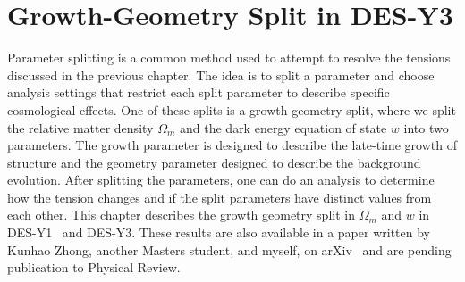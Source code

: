 \chapter{Growth-Geometry Split in DES-Y3}
Parameter splitting is a common method used to attempt to resolve the tensions discussed in the previous chapter. The idea is to split a parameter and choose analysis settings that restrict each split parameter to describe specific cosmological effects. One of these splits is a growth-geometry split, where we split the relative matter density $\Omega_m$ and the dark energy equation of state $w$ into two parameters. The growth parameter is designed to describe the late-time growth of structure and the geometry parameter designed to describe the background evolution. After splitting the parameters, one can do an analysis to determine how the tension changes and if the split parameters have distinct values from each other. This chapter describes the growth geometry split in $\Omega_m$ and $w$ in DES-Y1~\cite{muir_y1_2021} and DES-Y3. These results are also available in a paper written by Kunhao Zhong, another Masters student, and myself, on arXiv~\cite{zhong_growth_2023} and are pending publication to Physical Review.
